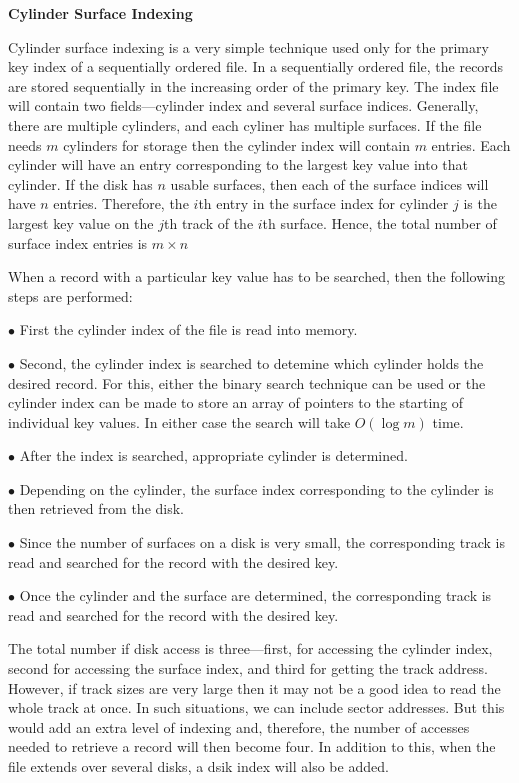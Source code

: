 \filbreak
\vskip 1cm
{\bf Cylinder Surface Indexing}

\vskip 1mm
Cylinder surface indexing is a very simple technique used only for the primary key index of a sequentially ordered file. In a sequentially ordered file, the records are stored sequentially in the increasing order of the primary key. The index file will contain two fields---cylinder index and several surface indices. Generally, there are multiple cylinders, and each cyliner has multiple surfaces. If the file needs $m$ cylinders for storage then the cylinder index will contain $m$ entries. Each cylinder will have an entry corresponding to the largest key value into that cylinder. If the disk has $n$ usable surfaces, then each of the surface indices will have $n$ entries. Therefore, the $i$th entry in the surface index for cylinder $j$ is the largest key value on the $j$th track of the $i$th surface. Hence, the total number of surface index entries is $m\times n$

\vskip 1mm
When a record with a particular key value has to be searched, then the following steps are performed:

\vskip 3mm
\qquad$\bullet$ First the cylinder index of the file is read into memory.

\vskip 3mm
\qquad$\bullet$ Second, the cylinder index is searched to detemine which cylinder holds the desired record. For this, either the binary search technique can be used or the cylinder index can be made to store an array of pointers to the starting of individual key values. In either case the search will take $O(\log m)$ time.

\vskip 3mm
\qquad$\bullet$ After the index is searched, appropriate cylinder is determined.

\vskip 3mm
\qquad$\bullet$ Depending on the cylinder, the surface index corresponding to the cylinder is then retrieved from the disk.

\vskip 3mm
\qquad$\bullet$ Since the number of surfaces on a disk is very small, the corresponding track is read and searched for the record with the desired key.

\vskip 3mm
\qquad$\bullet$ Once the cylinder and the surface are determined, the corresponding track is read and searched for the record with the desired key.

\vskip 1mm
The total number if disk access is three---first, for accessing the cylinder index, second for accessing the surface index, and third for getting the track address. However, if track sizes are very large then it may not be a good idea to read the whole track at once. In such situations, we can include sector addresses. But this would add an extra level of indexing and, therefore, the number of accesses needed to retrieve a record will then become four. In addition to this, when the file extends over several disks, a dsik index will also be added.

